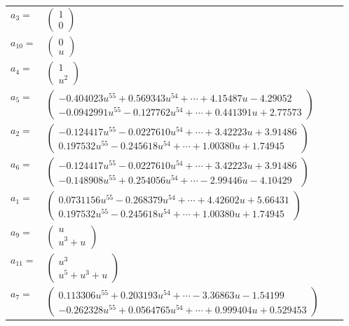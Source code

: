 \documentclass[1p]{elsarticle_modified}
\theoremstyle{definition}
\begin{document}
\begin{tabular}{m{7pt} m{180pt} m{7pt} m{180pt} }
\flushright $a_{3}=$&$\begin{pmatrix}1\\0\end{pmatrix}$ \\
\flushright $a_{10}=$&$\begin{pmatrix}0\\u\end{pmatrix}$ \\
\flushright $a_{4}=$&$\begin{pmatrix}1\\u^2\end{pmatrix}$ \\
\flushright $a_{5}=$&$\begin{pmatrix}-0.404023 u^{55}+0.569343 u^{54}+\cdots+4.15487 u-4.29052\\-0.0942991 u^{55}-0.127762 u^{54}+\cdots+0.441391 u+2.77573\end{pmatrix}$ \\
\flushright $a_{2}=$&$\begin{pmatrix}-0.124417 u^{55}-0.0227610 u^{54}+\cdots+3.42223 u+3.91486\\0.197532 u^{55}-0.245618 u^{54}+\cdots+1.00380 u+1.74945\end{pmatrix}$ \\
\flushright $a_{6}=$&$\begin{pmatrix}-0.124417 u^{55}-0.0227610 u^{54}+\cdots+3.42223 u+3.91486\\-0.148908 u^{55}+0.254056 u^{54}+\cdots-2.99446 u-4.10429\end{pmatrix}$ \\
\flushright $a_{1}=$&$\begin{pmatrix}0.0731156 u^{55}-0.268379 u^{54}+\cdots+4.42602 u+5.66431\\0.197532 u^{55}-0.245618 u^{54}+\cdots+1.00380 u+1.74945\end{pmatrix}$ \\
\flushright $a_{9}=$&$\begin{pmatrix}u\\u^3+u\end{pmatrix}$ \\
\flushright $a_{11}=$&$\begin{pmatrix}u^3\\u^5+u^3+u\end{pmatrix}$ \\
\flushright $a_{7}=$&$\begin{pmatrix}0.113306 u^{55}+0.203193 u^{54}+\cdots-3.36863 u-1.54199\\-0.262328 u^{55}+0.0564765 u^{54}+\cdots+0.999404 u+0.529453\end{pmatrix}$ \\

\end{tabular}
\end{document}
